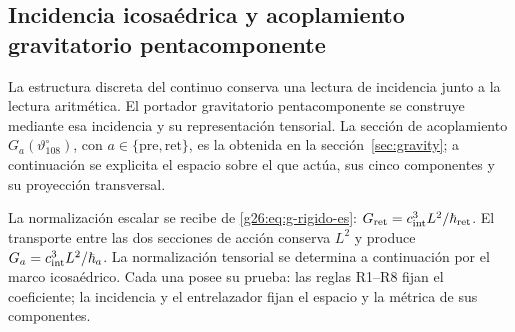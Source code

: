 \subsection{Incidencia icosaédrica y acoplamiento gravitatorio pentacomponente}
\label{sec:ii-pentadica}

La estructura discreta del continuo conserva una lectura de incidencia
junto a la lectura aritmética. El portador gravitatorio pentacomponente se
construye mediante esa incidencia y su representación tensorial. La sección
de acoplamiento \(G_a(\vartheta^\circ_{108})\), con
\(a\in\{\mathrm{pre},\mathrm{ret}\}\), es la obtenida en la
sección~\ref{sec:gravity}; a continuación se explicita el espacio sobre el
que actúa, sus cinco componentes y su proyección transversal.

La normalización escalar se recibe de
\eqref{g26:eq:g-rigido-es}: \(G_{\rm ret}=c_{\rm int}^3L^2/\hbar_{\rm ret}\).
El transporte entre las dos secciones de acción conserva \(L^2\) y
produce \(G_a=c_{\rm int}^3L^2/\hbar_a\). La normalización tensorial
se determina a continuación por el marco icosaédrico. Cada una posee
su prueba: las reglas R1--R8 fijan el coeficiente; la incidencia y el
entrelazador fijan el espacio y la métrica de sus componentes.

